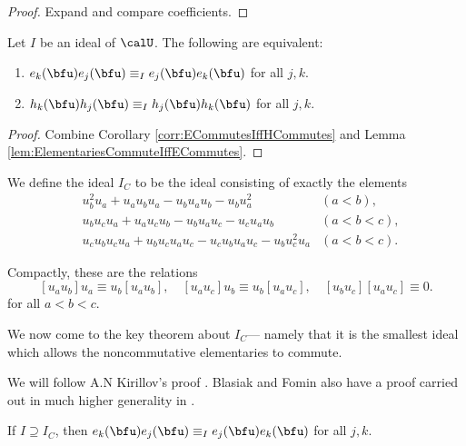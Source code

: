 \documentclass{article}
\begin{document}
\begin{proof}
    Expand and compare coefficients.
\end{proof}

\begin{lemma}
    Let $I$ be an ideal of $\calU$.
    The following are equivalent:
    \begin{enumerate}[label=(\alph*)]
        \item 
            $e_k(\bfu)e_j(\bfu) \equiv_I e_j(\bfu)e_k(\bfu)$ for all $j,k$. 
        \item 
            $h_k(\bfu)h_j(\bfu) \equiv_I h_j(\bfu)h_k(\bfu)$ for all $j,k$.
    \end{enumerate}
\end{lemma}

\begin{proof}
    Combine Corollary \ref{corr:ECommutesIffHCommutes} and Lemma \ref{lem:ElementariesCommuteIffECommutes}.
\end{proof}


\begin{definition}
    We define the ideal $I_C$ to be the ideal consisting of exactly the elements
    \begin{align}
        &
        u_b^2u_a + u_au_bu_a - u_bu_au_b - u_bu_a^2 
        &
        (a<b),
        \\
        &
        u_bu_cu_a + u_au_cu_b - u_bu_au_c - u_cu_au_b
        &
        (a<b<c),
        \\
        &
        u_cu_bu_cu_a + u_bu_cu_au_c - u_cu_bu_au_c - u_bu_c^2u_a
        &
        (a<b<c).
    \end{align}
\end{definition}

Compactly, these are the relations
\[
    [u_au_b]u_a \equiv u_b[u_au_b], \quad
    [u_au_c]u_b \equiv u_b[u_au_c], \quad
    [u_bu_c][u_au_c] \equiv 0.
\]
for all $a<b<c$.

We now come to the key theorem about $I_C$--- namely that it is the smallest ideal which allows the noncommutative elementaries to commute.

We will follow A.N Kirillov's proof \cite[Theorem 2.26]{K16}.
Blasiak and Fomin also have a proof carried out in much higher generality in \cite{BF18}.

\begin{theorem}
    \label{thm:ICImpliesEsCommute}
    If $I \supseteq I_C$, then $e_k(\bfu)e_j(\bfu) \equiv_I e_j(\bfu)e_k(\bfu)$ for all $j,k$. 
\end{theorem}
\end{document}
